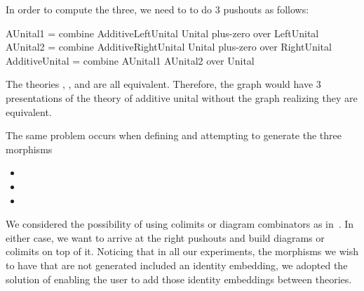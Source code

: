 In order to compute the three, we need to to do $3$ pushouts as follows:
\begin{togcode} 
AUnital1 = combine AdditiveLeftUnital {} Unital plus-zero 
           over LeftUnital
AUnital2 = combine AdditiveRightUnital {} Unital plus-zero 
           over RightUnital 
AdditiveUnital = combine AUnital1 {} AUnital2 {} over Unital 
\end{togcode} 
The theories , , and  are all equivalent. Therefore, the graph would have $3$ presentations of the theory of additive unital without the graph realizing they are equivalent. 

The same problem occurs when defining  and attempting to generate the three morphisms 
\begin{itemize}
    \item {}
    \item {}
    \item {}
\end{itemize}

We considered the possibility of using colimits or diagram combinators as in~\cite{cicm2019diagrams}. In either case, we want to arrive at the right pushouts and build diagrams or colimits on top of it. 
Noticing that in all our experiments, the morphisms we wish to have that are not generated included an identity embedding, we adopted the solution of enabling the user to add those identity embeddings between theories. %

